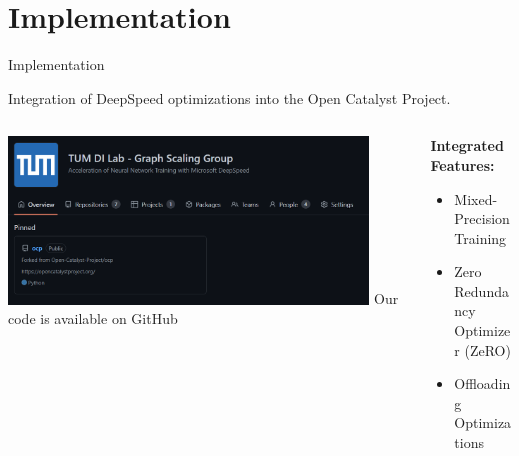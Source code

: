 \section{Implementation}

\begin{frame}{Implementation}
    \begin{center}
        Integration of DeepSpeed optimizations into the Open Catalyst Project.
        \vspace{0.5cm}
    \end{center}

    \begin{columns}
        \centering
        \begin{column}{0.5\textwidth}
            \centering
            \includegraphics[width=0.9\textwidth]{figures/ocp-branch.png}
            Our code is available on GitHub\footnotemark
        \end{column} 

        \begin{column}{0.5\textwidth}
            \textbf{Integrated Features:}

            \begin{itemize}
                \item \textcolor{tum-green}{} Mixed-Precision Training
                \item \textcolor{tum-green}{} Zero Redundancy Optimizer (ZeRO)
                \item \textcolor{tum-green}{} Offloading Optimizations
            \end{itemize}
        \end{column} 
    \end{columns}
\end{frame}

